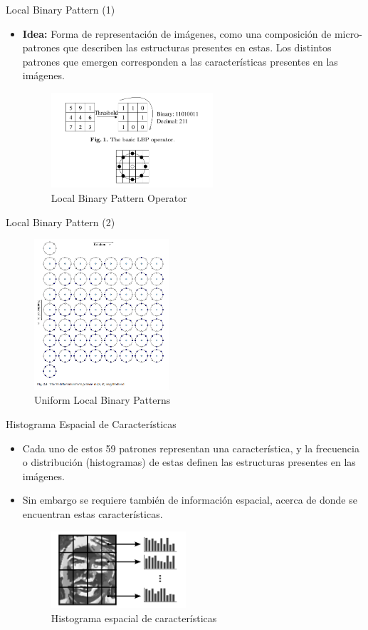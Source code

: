 \documentclass{beamer}
\begin{document}
\begin{frame}{Local Binary Pattern (1)}
\begin{itemize}
    \item \textbf{Idea:} Forma de representación de imágenes, como una composición de micro-patrones que describen
    las estructuras presentes en estas. Los distintos patrones que emergen corresponden a las características presentes
    en las imágenes.
\begin{figure}[htpb!]
\centering
\includegraphics[width=6cm]{lbp}
\caption{Local Binary Pattern Operator}
\end{figure}
\end{itemize}
\end{frame}

\begin{frame}{Local Binary Pattern (2)}
\begin{figure}[htpb!]
\centering
\includegraphics[width=5cm]{uniform_lbp}
\caption{Uniform Local Binary Patterns}
\end{figure}
\end{frame}



\begin{frame}{Histograma Espacial de Características}
\begin{itemize}
    \item Cada uno de estos 59 patrones representan una característica, y la frecuencia o distribución (histogramas) de estas definen las estructuras presentes en las imágenes.
    \item Sin embargo se requiere también de información espacial, acerca de donde se encuentran estas características.
\begin{figure}[htpb!]
\centering
\includegraphics[width=5cm]{spatial_hist}
\caption{Histograma espacial de características}
\end{figure}
\end{itemize}
\end{frame}
\end{document}
